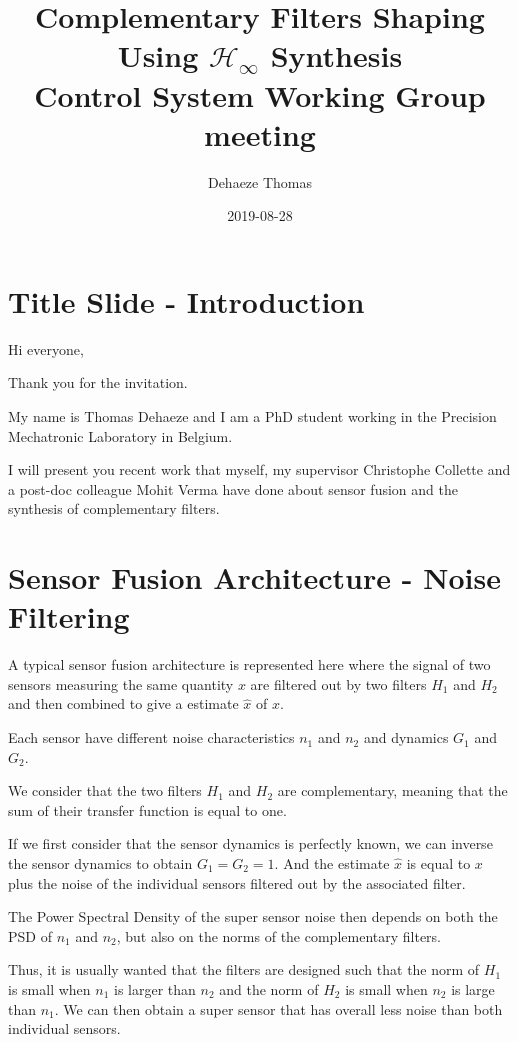 \documentclass[hangsection=false, titlepage=false, tocnp=false]{cleanreport}
\author{Dehaeze Thomas}
\date{2019-08-28}
\title{Complementary Filters Shaping Using \(\mathcal{H}_\infty\) Synthesis\\\medskip
\large Control System Working Group meeting}
\begin{document}
\maketitle

\section{Title Slide - Introduction}
\label{sec:org2616a5c}
Hi everyone,

Thank you for the invitation.

My name is Thomas Dehaeze and I am a PhD student working in the Precision Mechatronic Laboratory in Belgium.

I will present you recent work that myself, my supervisor Christophe Collette and a post-doc colleague Mohit Verma have done about sensor fusion and the synthesis of complementary filters.

\section{Sensor Fusion Architecture - Noise Filtering}
\label{sec:org3776d94}
A typical sensor fusion architecture is represented here where the signal of two sensors measuring the same quantity \(x\) are filtered out by two filters \(H_1\) and \(H_2\) and then combined to give a estimate \(\hat{x}\) of \(x\).

Each sensor have different noise characteristics \(n_1\) and \(n_2\) and dynamics \(G_1\) and \(G_2\).

We consider that the two filters \(H_1\) and \(H_2\) are complementary, meaning that the sum of their transfer function is equal to one.

If we first consider that the sensor dynamics is perfectly known, we can inverse the sensor dynamics to obtain \(G_1 = G_2 = 1\). And the estimate \(\hat{x}\) is equal to \(x\) plus the noise of the individual sensors filtered out by the associated filter.

The Power Spectral Density of the super sensor noise then depends on both the PSD of \(n_1\) and \(n_2\), but also on the norms of the complementary filters.

Thus, it is usually wanted that the filters are designed such that the norm of \(H_1\) is small when \(n_1\) is larger than \(n_2\) and the norm of \(H_2\) is small when \(n_2\) is large than \(n_1\). We can then obtain a super sensor that has overall less noise than both individual sensors.
\end{document}
